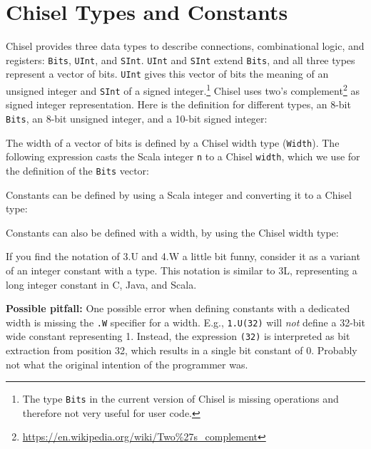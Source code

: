 \documentclass[%
    10pt,
    headinclude, footexclude,
    openright, %
    notitlepage,
    cleardoubleempty,
    headsepline,
    pointlessnumbers,
    bibtotoc, idxtotoc,
    ]{scrbook}
\newcommand{\code}[1]{{\lstinline[basicstyle=\small\ttfamily]{#1}}}
\newcommand{\codefoot}[1]{{\lstinline[basicstyle=\footnotesize\ttfamily]{#1}}}
\newcommand{\myref}[2]{\href{#1}{#2}}
\renewcommand{\myref}[2]{{#2}{\footnote{\url{#1}}}}
\begin{document}
\section{Chisel Types and Constants}

Chisel provides three data types to describe connections, combinational logic, and registers:
\code{Bits}, \code{UInt}, and \code{SInt}. \code{UInt} and \code{SInt} extend \code{Bits},
and all three types represent a vector of bits. \code{UInt} gives this vector of
bits the meaning of an unsigned integer and \code{SInt} of a signed
integer.\footnote{The type \codefoot{Bits} in the current version of Chisel is missing operations and
therefore not very useful for user code.}
Chisel uses \myref{https://en.wikipedia.org/wiki/Two\%27s\_complement}{two's complement}
as signed integer representation.
Here is the definition for different types, an 8-bit \code{Bits}, an 8-bit unsigned integer, and a 10-bit
signed integer:


\noindent The width of a vector of bits is defined by a Chisel width type (\code{Width}).
The following expression casts the Scala integer \code{n} to a Chisel \code{width},
which we use for the definition of the \code{Bits} vector:




\noindent Constants can be defined by using a Scala integer and converting it to a Chisel type:


\noindent Constants can also be defined with a width, by using the Chisel width type:


\noindent If you find the notation of 3.U and 4.W a little bit funny, consider it as a variant of an integer
constant with a type. This notation is similar to 3L, representing a long integer constant in C, Java, and Scala.

{\bf Possible pitfall:} One possible error when defining constants with a dedicated width is missing the \code{.W}
specifier for a width. E.g., \code{1.U(32)} will \emph{not} define a 32-bit wide constant representing 1.
Instead, the expression \code{(32)} is interpreted as bit extraction from position 32, which results
in a single bit constant of 0. Probably not what the original intention of the programmer was.
\end{document}
